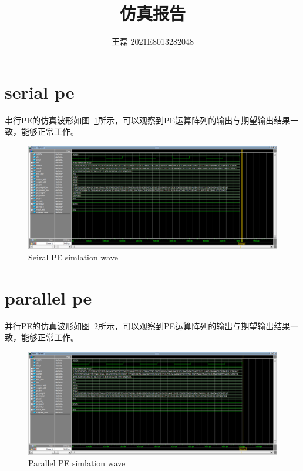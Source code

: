 \documentclass[lang=cn,11pt,a4paper]{elegantpaper}
\title{仿真报告}
\author{王磊 2021E8013282048 \\ }
\institute{\href{http://www.ict.ac.cn/}{中国科学院计算技术研究所}}
\date{\zhtoday}
\begin{document}
\maketitle



\section{serial pe}

串行PE的仿真波形如图~\ref{fig:serial-result}所示，可以观察到PE运算阵列的输出与期望输出结果一致，能够正常工作。

\begin{figure}[!htbp]
  \centering
  \includegraphics[width=1.0\textwidth]{image/serial.png}
  \caption{Seiral PE simlation wave}
  \label{fig:serial-result}
\end{figure}


\section{parallel pe}

并行PE的仿真波形如图~\ref{fig:parallel-result}所示，可以观察到PE运算阵列的输出与期望输出结果一致，能够正常工作。

\begin{figure}[!htbp]
  \centering
  \includegraphics[width=1.0\textwidth]{image/parallel.png}
  \caption{Parallel PE simlation wave}
  \label{fig:parallel-result}
\end{figure}
\end{document}
